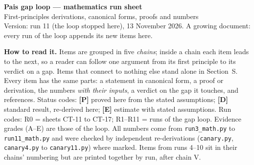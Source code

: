 \documentclass[10pt,a4paper]{article}
\theoremstyle{plain}
\theoremstyle{definition}
\begin{document}
\begin{center}
{\LARGE\bfseries Pais gap loop --- mathematics run sheet}\\[4pt]
{\large First-principles derivations, canonical forms, proofs and numbers}\\[4pt]
{\small Version: run 11 (the loop stopped here), 13 November 2026. A growing document: every run of the loop appends its new items here.}
\end{center}

\noindent\textbf{How to read it.} Items are grouped in five \emph{chains}; inside a chain each item leads to the next, so a reader can follow
one argument from its first principle to its verdict on a gap. Items that connect to nothing else stand alone in Section~S.
Every item has the same parts: a statement in canonical form, a proof or derivation, the numbers \emph{with their inputs},
a verdict on the gap it touches, and references. Status codes:
\textbf{[P]} proved here from the stated assumptions;
\textbf{[D]} standard result, re-derived here;
\textbf{[E]} estimate with stated assumptions.
Run codes: R0 = sheets CT-11 to CT-17; R1--R11 = runs of the gap loop. Evidence grades (A--E) are those of the loop.
All numbers come from \texttt{run3\_math.py} to \texttt{run11\_math.py} and were checked by independent re-derivations
(\texttt{canary.py}, \texttt{canary4.py} to \texttt{canary11.py}) where marked. Items from runs 4--10 sit in their chains' numbering but are printed
together by run, after chain V.
\end{document}
